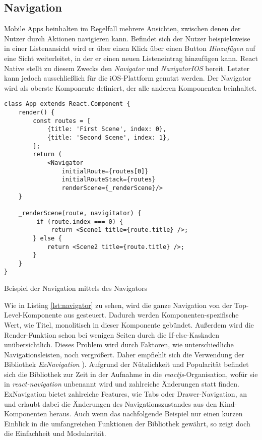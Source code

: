 \subsection{Navigation}
Mobile Apps beinhalten im Regelfall mehrere Ansichten, zwischen denen der Nutzer durch Aktionen navigieren kann. Befindet sich der Nutzer beispielsweise in einer Listenansicht wird er über einen Klick über einen Button \textit{Hinzufügen} auf eine Sicht weiterleitet, in der er einen neuen Listeneintrag hinzufügen kann. React Native stellt zu diesem Zwecks den \textit{Navigator} und \textit{NavigatorIOS} bereit. Letzter kann jedoch ausschließlich für die iOS-Plattform genutzt werden. Der Navigator wird als oberste Komponente definiert, der alle anderen Komponenten beinhaltet. 
\begin{listing}[H]
    \begin{verbatim}
class App extends React.Component {
    render() {
        const routes = [
            {title: 'First Scene', index: 0},
            {title: 'Second Scene', index: 1},
        ];
        return (
            <Navigator
                initialRoute={routes[0]}
                initialRouteStack={routes}
                renderScene={_renderScene}/>
    }
    
    _renderScene(route, navigitator) {
         if (route.index === 0) {
             return <Scene1 title={route.title} />;
        } else {
            return <Scene2 title={route.title} />;
        }
    }
}
    \end{verbatim}
    \caption{Beispiel der Navigation mittels des Navigators}
    \label{lst:navigator}
\end{listing}

Wie in Listing \ref{lst:navigator} zu sehen, wird die ganze Navigation von der Top-Level-Komponente aus gesteuert. Dadurch werden Komponenten-spezifische Wert, wie Titel, monolitisch in dieser Komponente gebündet. Außerdem wird die Render-Funktion schon bei wenigen Seiten durch die If-else-Kaskaden unübersichtlich. Dieses Problem wird durch Faktoren, wie unterschiedliche Navigationsleisten, noch vergrößert. Daher empfiehlt sich die Verwendung der Bibliothek \textit{ExNavigation} \cite{exNavigation_2016}). Aufgrund der Nützlichkeit und Popularität befindet sich die Bibliothek zur Zeit in der Aufnahme in die \textit{reactjs}-Organisation, wofür sie in \textit{react-navigation} unbenannt wird und zahlreiche Änderungen statt finden. ExNavigation bietet zahlreiche Features, wie Tabs oder Drawer-Navigation, an und erlaubt dabei die Änderungen des Navigationszustandes aus den Kind-Komponenten heraus. Auch wenn das nachfolgende Beispiel nur einen kurzen Einblick in die umfangreichen Funktionen der Bibliothek gewährt, so zeigt doch die Einfachheit und Modularität.

